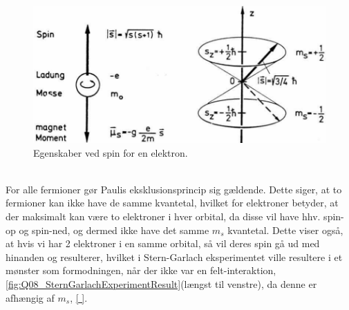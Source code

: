 \begin{figure}[!h]
    \centering
    \includegraphics[width=\textwidth]{Q08/images/ProportiesOfSpin.PNG}
    \caption{Egenskaber ved spin for en elektron.}
    \label{fig:Q08_PropertiesOfSpin}
\end{figure}
$ $\\

For alle fermioner gør Paulis eksklusionsprincip sig gældende. Dette siger, at to fermioner kan ikke have de samme kvantetal, hvilket for elektroner betyder, at der maksimalt kan være to elektroner i hver orbital, da disse vil have hhv. spin-op og spin-ned, og dermed ikke have det samme $m_s$ kvantetal. Dette viser også, at hvis vi har 2 elektroner i en samme orbital, så vil deres spin gå ud med hinanden og resulterer, hvilket i Stern-Garlach eksperimentet ville resultere i et mønster som formodningen, når der ikke var en felt-interaktion, \cref{fig:Q08_SternGarlachExperimentResult}(længst til venstre), da denne er afhængig af $m_s$, \cref{ }.